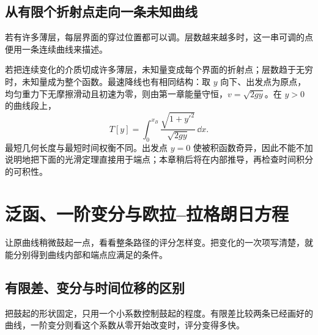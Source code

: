 \subsection{从有限个折射点走向一条未知曲线}
若有许多薄层，每层界面的穿过位置都可以调。层数越来越多时，这一串可调的点便用一条连续曲线来描述。

若把连续变化的介质切成许多薄层，未知量变成每个界面的折射点；层数趋于无穷时，未知量成为整个函数。最速降线也有相同结构：取 $y$ 向下、出发点为原点，均匀重力下无摩擦滑动且初速为零，则由第一章能量守恒，$v=\sqrt{2gy}$。在 $y>0$ 的曲线段上，
\begin{equation}\label{eq:brachistochrone-functional}
T[y]=\int_0^{x_B}\frac{\sqrt{1+y'^2}}{\sqrt{2gy}}\,\dd x.
\end{equation}
最短几何长度与最短时间权衡不同。出发点 $y=0$ 使被积函数奇异，因此不能不加说明地把下面的光滑定理直接用于端点；本章稍后将在内部推导，再检查时间积分的可积性。

\section{泛函、一阶变分与欧拉--拉格朗日方程}
让原曲线稍微鼓起一点，看看整条路径的评分怎样变。把变化的一次项写清楚，就能分别得到曲线内部和端点应满足的条件。

\subsection{有限差、变分与时间位移的区别}
把鼓起的形状固定，只用一个小系数控制鼓起的程度。有限差比较两条已经画好的曲线，一阶变分则看这个系数从零开始改变时，评分变得多快。


